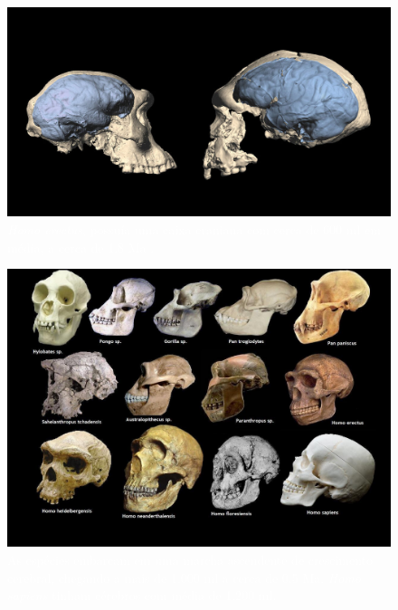 \documentclass[aspectratio=169]{beamer} %
\begin{document}
{\begin{frame}
    \begin{minipage}{0.5\textwidth}
	    \begin{figure}
	\centering
        \includegraphics[scale=0.5]{images/cerebros.jpg} %
		    \caption{\textcolor{white}{\textit{Homo erectus}, possuía uma caixa craniana com cerca de 600 ml em média, a cerca de 1.8 Ma .}} %
	    \end{figure}
    \end{minipage}%
		\pause
    \begin{minipage}{0.5\textwidth}
	    \begin{figure}
        \centering
        \includegraphics[scale=0.2]{images/anatomia-primata.jpg} %
		    \caption{\textcolor{white}{As espécies embarcam em uma marcha ascendente de crescimento cerebral, chegando a mais de 1.000 ml a cerca de 0.5 Ma. \textit{Homo sapiens} tinham cérebros com média de 1.200 ml. }} %
	    \end{figure}
    \end{minipage}

\flushright
		\textcolor{blue}{\citep{Hofman2019,Lindhout2024}}
		
	\end{frame}
}
\end{document}
